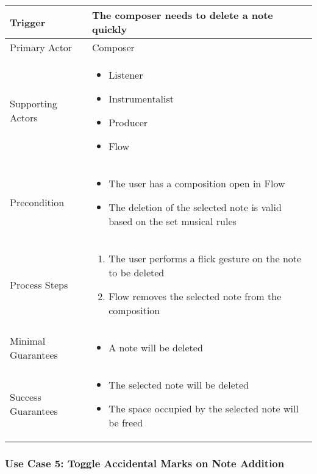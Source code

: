 \begin{tabularx}{\textwidth}{|X|X|}
\hline
Trigger & 
The composer needs to delete a note quickly \\
\hline
Primary Actor & 
Composer\\
\hline
Supporting Actors & 
\begin{itemize}
\item Listener
\item Instrumentalist
\item Producer
\item Flow
\end{itemize} \\
\hline
Precondition & 
\begin{itemize}
\item The user has a composition open in Flow 
\item The deletion of the selected note is valid based on the set musical rules
\end{itemize} \\
\hline
Process Steps & 
\begin{enumerate}
\item The user performs a flick gesture on the note to be deleted
\item Flow removes the selected note from the composition
\end{enumerate} \\
\hline
Minimal Guarantees & 
\begin{itemize}
  \item A note will be deleted
\end{itemize} \\
\hline
Success Guarantees & 
\begin{itemize}
  \item The selected note will be deleted
  \item The space occupied by the selected note will be freed
\end{itemize} \\
\hline
\end{tabularx}

\subsubsection{Use Case 5: Toggle Accidental Marks on Note Addition}

